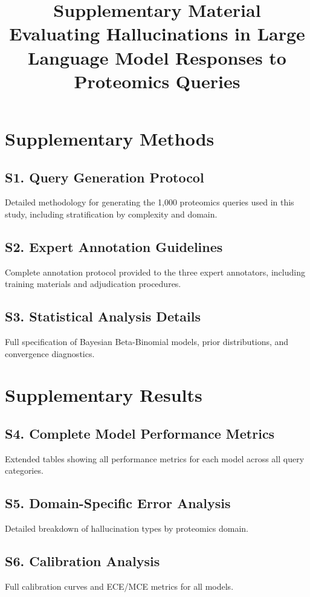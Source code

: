 \documentclass[11pt]{article}
\title{Supplementary Material\\
\large Evaluating Hallucinations in Large Language Model Responses to Proteomics Queries}
\author{}
\date{}
\begin{document}
\maketitle

\section*{Supplementary Methods}

\subsection*{S1. Query Generation Protocol}
Detailed methodology for generating the 1,000 proteomics queries used in this study, including stratification by complexity and domain.

\subsection*{S2. Expert Annotation Guidelines}
Complete annotation protocol provided to the three expert annotators, including training materials and adjudication procedures.

\subsection*{S3. Statistical Analysis Details}
Full specification of Bayesian Beta-Binomial models, prior distributions, and convergence diagnostics.

\section*{Supplementary Results}

\subsection*{S4. Complete Model Performance Metrics}
Extended tables showing all performance metrics for each model across all query categories.

\subsection*{S5. Domain-Specific Error Analysis}
Detailed breakdown of hallucination types by proteomics domain.

\subsection*{S6. Calibration Analysis}
Full calibration curves and ECE/MCE metrics for all models.
\end{document}
